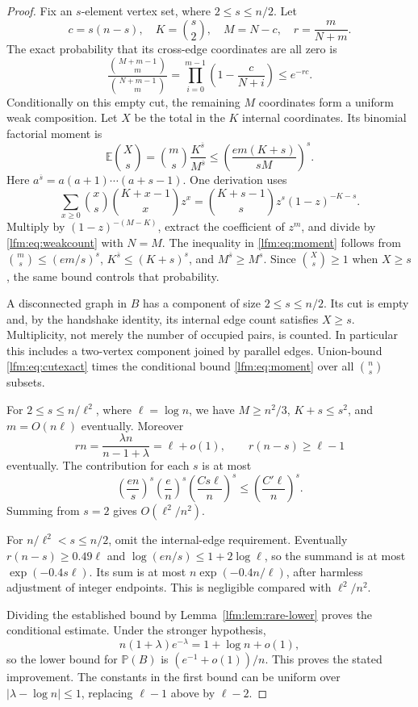 \documentclass[11pt,letterpaper]{article}
\theoremstyle{remark}\newtheorem{remark}[theorem]{Remark}
\newcommand{\Prob}{\mathbb P}\newcommand{\E}{\mathbb E}
\newcommand{\rf}[2]{#1^{\overline{#2}}}
\begin{document}
\begin{proof}
Fix an $s$-element vertex set, where $2\le s\le n/2$. Let
\[
 c=s(n-s),\quad K=\binom s2,\quad M=N-c,\quad r=\frac m{N+m}.
\]
The exact probability that its cross-edge coordinates are all zero is
\begin{equation}
 \frac{\binom{M+m-1}{m}}{\binom{N+m-1}{m}}
 =\prod_{i=0}^{m-1}\left(1-\frac c{N+i}\right)
 \le e^{-rc}.\label{lfm:eq:cutexact}
\end{equation}
Conditionally on this empty cut, the remaining $M$ coordinates form a uniform weak composition. Let $X$ be the total in the $K$ internal coordinates. Its binomial factorial moment is
\begin{equation}
 \E\binom Xs=\binom ms\frac{\rf K s}{\rf M s}
 \le\left(\frac{em(K+s)}{sM}\right)^s.\label{lfm:eq:moment}
\end{equation}
Here $a^{\overline{s}}=a(a+1)\cdots(a+s-1)$. One derivation uses
\[
 \sum_{x\ge0}\binom xs\binom{K+x-1}{x}z^x
 =\binom{K+s-1}{s}z^s(1-z)^{-K-s}.
\]
Multiply by $(1-z)^{-(M-K)}$, extract the coefficient of $z^m$, and divide by \eqref{lfm:eq:weakcount} with $N=M$. The inequality in \eqref{lfm:eq:moment} follows from $\binom ms\le(em/s)^s$, $\rf K s\le(K+s)^s$, and $\rf M s\ge M^s$. Since $\binom Xs\ge1$ when $X\ge s$, the same bound controls that probability.

A disconnected graph in $B$ has a component of size $2\le s\le n/2$. Its cut is empty and, by the handshake identity, its internal edge count satisfies $X\ge s$. Multiplicity, not merely the number of occupied pairs, is counted. In particular this includes a two-vertex component joined by parallel edges. Union-bound \eqref{lfm:eq:cutexact} times the conditional bound \eqref{lfm:eq:moment} over all $\binom ns$ subsets.

For $2\le s\le n/\ell^2$, where $\ell=\log n$, we have $M\ge n^2/3$, $K+s\le s^2$, and $m=O(n\ell)$ eventually. Moreover
\[
 rn=\frac{\lambda n}{n-1+\lambda}=\ell+o(1),\qquad
 r(n-s)\ge\ell-1
\]
eventually. The contribution for each $s$ is at most
\[
 \left(\frac{en}{s}\right)^s
 \left(\frac en\right)^s
 \left(\frac{Cs\ell}{n}\right)^s
 \le\left(\frac{C'\ell}{n}\right)^s.
\]
Summing from $s=2$ gives $O(\ell^2/n^2)$.

For $n/\ell^2<s\le n/2$, omit the internal-edge requirement. Eventually $r(n-s)\ge0.49\ell$ and $\log(en/s)\le1+2\log\ell$, so the summand is at most $\exp(-0.4s\ell)$. Its sum is at most $n\exp(-0.4n/\ell)$, after harmless adjustment of integer endpoints. This is negligible compared with $\ell^2/n^2$.

Dividing the established bound by Lemma~\ref{lfm:lem:rare-lower} proves the conditional estimate. Under the stronger hypothesis,
\[
 n(1+\lambda)e^{-\lambda}=1+\log n+o(1),
\]
so the lower bound for $\Prob(B)$ is $(e^{-1}+o(1))/n$. This proves the stated improvement. The constants in the first bound can be uniform over $|\lambda-\log n|\le1$, replacing $\ell-1$ above by $\ell-2$.
\end{proof}
\end{document}
